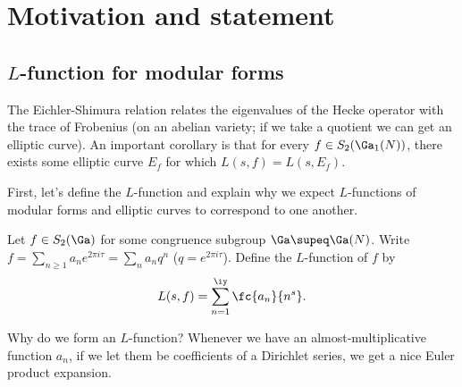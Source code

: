 \def\filepath{C:/Users/Owner/Dropbox/Math/templates}





%


%

\pagestyle{fancy}
\chead{} 
\rhead{} 
\lfoot{} 
\cfoot{\thepage} 
\rfoot{} 
\renewcommand{\headrulewidth}{.3pt} 
\setlength\voffset{0in}
\setlength\textheight{648pt}



\tableofcontents
\section{Motivation and statement}
\subsection{$L$-function for modular forms}
The Eichler-Shimura relation relates the eigenvalues of the Hecke operator with the trace of Frobenius (on an abelian variety; if we take a quotient we can get an elliptic curve). An important corollary is that for every $f\in S_2(\Ga_1(N))$, there exists some elliptic curve $E_f$ for which $L(s,f)=L(s,E_f)$.

First, let's define the $L$-function and explain why we expect $L$-functions of modular forms and elliptic curves to correspond to one another.

\begin{df}
Let $f\in S_2(\Ga)$ for some congruence subgroup $\Ga\supeq \Ga(N)$. 
Write $f=\sum_{n\ge 1} a_n e^{{2\pi i \tau}}=\sum_n a_nq^n$ ($q=e^{{2\pi i \tau}}$). %
Define the $L$-function of $f$ by
\[
L(s,f)=\sum_{n=1}^{\iy}\fc{a_n}{n^s}.
\]
\end{df}
Why do we form an $L$-function? Whenever we have an almost-multiplicative function $a_n$, if we let them be coefficients of a Dirichlet series, we get a nice Euler product expansion.


